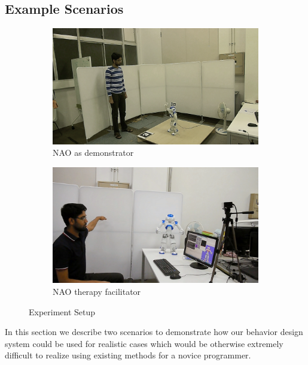 \documentclass{llncs}
\begin{document}
\subsection{Example Scenarios}
\begin{figure}
\centering
\begin{subfigure}[t]{0.49\textwidth}
\includegraphics[width=\textwidth]{../thesis/assets/scenario_museum.png}
\caption[Experiment Setup 1]{NAO as demonstrator}
\label{fig:scenario1_setup}
\end{subfigure}
\begin{subfigure}[t]{0.49\textwidth}
\includegraphics[width=\textwidth]{../thesis/assets/scenario_therapy.png}
\caption[Experiment Setup 2]{NAO therapy facilitator}
\label{fig:scenario2_setup}
\end{subfigure}
\caption[Experiment Setup]{Experiment Setup}
\label{fig:scenarios_setup}
\end{figure}
	In this section we describe two scenarios to demonstrate how our behavior design system could be used for realistic cases which would be otherwise extremely difficult to realize using existing methods for a novice programmer.
\end{document}
